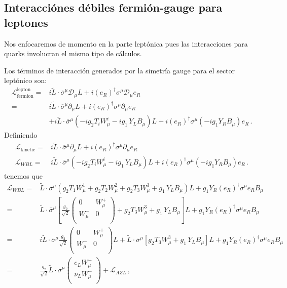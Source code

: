 \subsection{Interacciónes débiles fermión-gauge para leptones}

Nos enfocaremos de momento en la parte leptónica pues las interacciones para quarks involucran el mismo tipo de cálculos.

Los términos de interacción generados por la simetría gauge para el sector leptónico son:
\begin{align}
\label{eq:devLW}
 \mathcal{L}_{\text{fermion}}^{\text{lepton}}=& i \widetilde{L}\cdot\overline{\sigma}^\mu\mathcal{D}_\mu L+  i \left( e_R \right)^{\dagger}{\sigma}^\mu\mathcal{D}_\mu e_R \nonumber\\
=&i \widetilde{L}\cdot\overline{\sigma}^\mu\partial_\mu L+i \left(e_R  \right)^{\dagger}\sigma^\mu\partial_\mu {e_R} \nonumber\\
&+ i \widetilde{L}\cdot\overline{\sigma}^\mu(-i g_2 T_iW_\mu^i-i {g_1}\,Y_LB_\mu) L + i \left( e_R \right)^{\dagger}\sigma^\mu \left( -i{g_1} Y_R B_{\mu} \right) {e_R}\,.
\end{align}
Definiendo
\begin{align}
\label{eq:knt}
  \mathcal{L}_{\text{kinetic}}=&i \widetilde{L}\cdot\overline{\sigma}^\mu\partial_\mu L+i \left(e_R  \right)^{\dagger}\sigma^\mu\partial_\mu {e_R} \\
  \mathcal{L}_{WBL}=&i \widetilde{L}\cdot\overline{\sigma}^\mu(-i g_2 T_iW_\mu^i-i {g_1}\,Y_LB_\mu) L + i \left( e_R \right)^{\dagger}\sigma^\mu \left( -i{g_1} Y_R B_{\mu} \right) {e_R}\nonumber\,.
\end{align}
tenemos que
\begin{align}
\mathcal{L}_{WBL}=& \widetilde{L}\cdot\overline{\sigma}^\mu(g_2 T_1W_\mu^1+ g_2 T_2W_\mu^2+g_2 T_3W_\mu^3+{g_1}\,Y_LB_\mu) L+ g_1 Y_R\left(e_R \right)^{\dagger}\sigma^\mu  {e_R} B_\mu\nonumber\\
=& \widetilde{L}\cdot\overline{\sigma}^\mu\left[\frac{g_2}{\sqrt{2}}
  \begin{pmatrix}
0 & W_\mu^+\\
W_\mu^- & 0\\    
  \end{pmatrix}
+g_2 T_3W_\mu^3+{g_1}\,Y_LB_\mu
\right]L+ {g_1} Y_R\left(e_R \right)^{\dagger}\sigma^\mu  {e_R} B_\mu\nonumber\\
=&i \widetilde{L}\cdot\overline{\sigma}^\mu\frac{g_2}{\sqrt{2}}
  \begin{pmatrix}
0 & W_\mu^+\\
W_\mu^- & 0\\    
  \end{pmatrix}L+
 \widetilde{L}\cdot\overline{\sigma}^\mu\left[g_2 T_3W_\mu^3+{g_1}\,Y_LB_\mu
\right]L+ {g_1} Y_R\left(e_R \right)^{\dagger}\sigma^\mu  {e_R} B_\mu\nonumber\\
  =& \frac{g_2}{\sqrt{2}}\widetilde{L}\cdot\overline{\sigma}^\mu
  \begin{pmatrix}
e_LW_\mu^+\\
\nu_L W_\mu^-\\    
  \end{pmatrix}+\mathcal{L}_{A Z L}\,,
\end{align}

